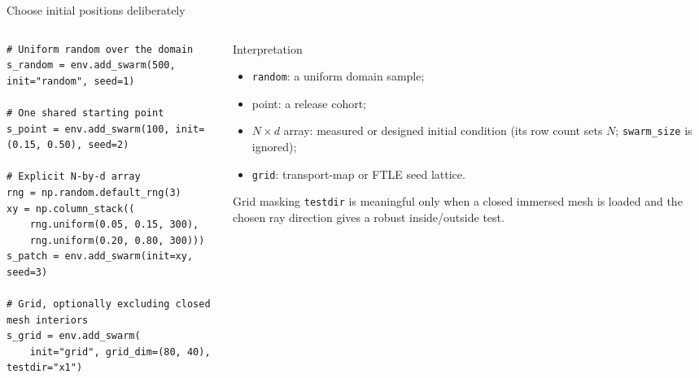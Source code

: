 \documentclass[aspectratio=169,11pt]{beamer}
\begin{document}
\begin{frame}[fragile]{Choose initial positions deliberately}
\footnotesize
\begin{columns}[T,onlytextwidth]
\begin{column}{0.59\textwidth}
\begin{lstlisting}
# Uniform random over the domain
s_random = env.add_swarm(500, init="random", seed=1)

# One shared starting point
s_point = env.add_swarm(100, init=(0.15, 0.50), seed=2)

# Explicit N-by-d array
rng = np.random.default_rng(3)
xy = np.column_stack((
    rng.uniform(0.05, 0.15, 300),
    rng.uniform(0.20, 0.80, 300)))
s_patch = env.add_swarm(init=xy, seed=3)

# Grid, optionally excluding closed mesh interiors
s_grid = env.add_swarm(
    init="grid", grid_dim=(80, 40), testdir="x1")
\end{lstlisting}
\end{column}
\begin{column}{0.37\textwidth}
\begin{block}{Interpretation}
\begin{itemize}\itemsep4pt
  \item \texttt{random}: a uniform domain sample;
  \item point: a release cohort;
  \item \(N\times d\) array: measured or designed initial condition (its row count sets \(N\); \texttt{swarm\_size} is ignored);
  \item \texttt{grid}: transport-map or FTLE seed lattice.
\end{itemize}
\end{block}
\begin{alertblock}{Grid masking}
{\footnotesize\texttt{testdir} is meaningful only when a closed immersed mesh is loaded and the chosen ray direction gives a robust inside/outside test.}
\end{alertblock}
\end{column}
\end{columns}
\end{frame}
\end{document}
